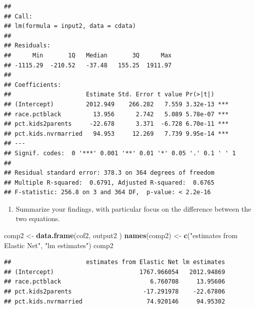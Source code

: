 \documentclass[]{article}
\newenvironment{Shaded}{\begin{snugshade}}{\end{snugshade}}
\newcommand{\KeywordTok}[1]{\textcolor[rgb]{0.13,0.29,0.53}{\textbf{#1}}}
\newcommand{\StringTok}[1]{\textcolor[rgb]{0.31,0.60,0.02}{#1}}
\newcommand{\NormalTok}[1]{#1}
\providecommand{\tightlist}{%
  \setlength{\itemsep}{0pt}\setlength{\parskip}{0pt}}
\begin{document}
\begin{verbatim}
## 
## Call:
## lm(formula = input2, data = cdata)
## 
## Residuals:
##      Min       1Q   Median       3Q      Max 
## -1115.29  -210.52   -37.48   155.25  1911.97 
## 
## Coefficients:
##                     Estimate Std. Error t value Pr(>|t|)    
## (Intercept)         2012.949    266.282   7.559 3.32e-13 ***
## race.pctblack         13.956      2.742   5.089 5.78e-07 ***
## pct.kids2parents     -22.678      3.371  -6.728 6.70e-11 ***
## pct.kids.nvrmarried   94.953     12.269   7.739 9.95e-14 ***
## ---
## Signif. codes:  0 '***' 0.001 '**' 0.01 '*' 0.05 '.' 0.1 ' ' 1
## 
## Residual standard error: 378.3 on 364 degrees of freedom
## Multiple R-squared:  0.6791, Adjusted R-squared:  0.6765 
## F-statistic: 256.8 on 3 and 364 DF,  p-value: < 2.2e-16
\end{verbatim}

\begin{enumerate}
\def\labelenumi{\arabic{enumi}.}
\setcounter{enumi}{2}
\tightlist
\item
  Summarize your findings, with particular focus on the difference
  between the two equations.
\end{enumerate}

\begin{Shaded}
\begin{Highlighting}[]
\NormalTok{comp2 <-}\StringTok{ }\KeywordTok{data.frame}\NormalTok{(cof2, output2 )}
\KeywordTok{names}\NormalTok{(comp2) <-}\StringTok{ }\KeywordTok{c}\NormalTok{(}\StringTok{"estimates from Elastic Net"}\NormalTok{, }\StringTok{"lm estimates"}\NormalTok{)}
\NormalTok{comp2}
\end{Highlighting}
\end{Shaded}

\begin{verbatim}
##                     estimates from Elastic Net lm estimates
## (Intercept)                        1767.966054   2012.94869
## race.pctblack                         6.760708     13.95606
## pct.kids2parents                    -17.291978    -22.67806
## pct.kids.nvrmarried                  74.920146     94.95302
\end{verbatim}
\end{document}
